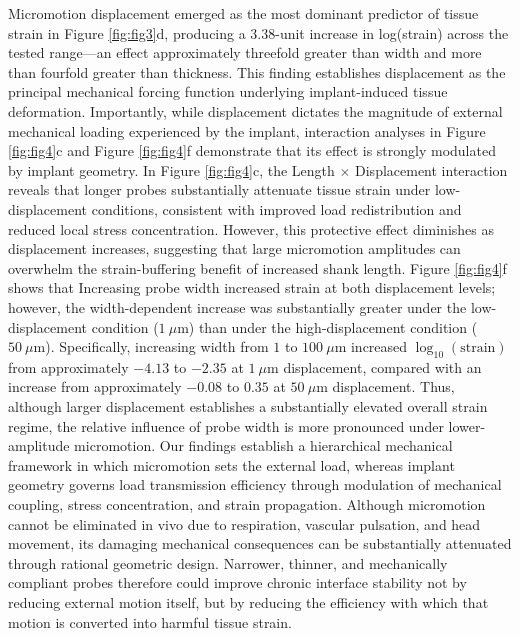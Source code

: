 \documentclass[fleqn,10pt]{wlscirep}
\begin{document}
Micromotion displacement emerged as the most dominant predictor of tissue strain in Figure \ref{fig:fig3}d, producing a 3.38-unit increase in log(strain) across the tested range---an effect approximately threefold greater than width and more than fourfold greater than thickness. This finding establishes displacement as the principal mechanical forcing function underlying implant-induced tissue deformation. Importantly, while displacement dictates the magnitude of external mechanical loading experienced by the implant, interaction analyses in Figure \ref{fig:fig4}c and Figure \ref{fig:fig4}f demonstrate that its effect is strongly modulated by implant geometry. In Figure \ref{fig:fig4}c, the Length $\times$ Displacement interaction reveals that longer probes substantially attenuate tissue strain under low-displacement conditions, consistent with improved load redistribution and reduced local stress concentration. However, this protective effect diminishes as displacement increases, suggesting that large micromotion amplitudes can overwhelm the strain-buffering benefit of increased shank length.  Figure \ref{fig:fig4}f shows that Increasing probe width increased strain at both displacement levels; however, the width-dependent increase was substantially greater under the low-displacement condition ($1~\mu\mathrm{m}$) than under the high-displacement condition ($50~\mu\mathrm{m}$). Specifically, increasing width from $1$ to $100~\mu\mathrm{m}$ increased $\log_{10}(\mathrm{strain})$ from approximately $-4.13$ to $-2.35$ at $1~\mu\mathrm{m}$ displacement, compared with an increase from approximately $-0.08$ to $0.35$ at $50~\mu\mathrm{m}$ displacement. Thus, although larger displacement establishes a substantially elevated overall strain regime, the relative influence of probe width is more pronounced under lower-amplitude micromotion.
Our findings establish a hierarchical mechanical framework in which micromotion sets the external load, whereas implant geometry governs load transmission efficiency through modulation of mechanical coupling, stress concentration, and strain propagation. Although micromotion cannot be eliminated in vivo due to respiration, vascular pulsation, and head movement, its damaging mechanical consequences can be substantially attenuated through rational geometric design. Narrower, thinner, and mechanically compliant probes therefore could improve chronic interface stability not by reducing external motion itself, but by reducing the efficiency with which that motion is converted into harmful tissue strain.
\end{document}
